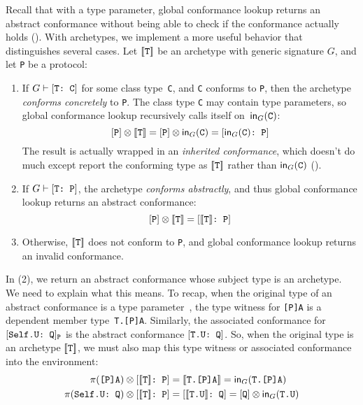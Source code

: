 \documentclass[../generics]{subfiles}
\begin{document}
Recall that with a type parameter, global conformance lookup returns an abstract conformance without being able to check if the conformance actually holds (). With archetypes, we implement a more useful behavior that distinguishes several cases. Let $[\![\texttt{T}]\!]$ be an archetype with generic signature $G$, and let \texttt{P} be a protocol:
\begin{enumerate}
\item If $G\vdash[\texttt{T:~C}]$ for some class type~\texttt{C}, and \texttt{C} conforms to \texttt{P}, then the archetype \emph{conforms concretely} to \texttt{P}. The class type \texttt{C} may contain type parameters, so global conformance lookup recursively calls itself on~$\mathsf{in}_G(\texttt{C})$:
\[[\texttt{P}] \otimes [\![\texttt{T}]\!]=[\texttt{P}] \otimes \mathsf{in}_G(\texttt{C})=[\texttt{$\mathsf{in}_G(\texttt{C})$:~P}]\]
The result is actually wrapped in an \emph{inherited conformance}, which doesn't do much except report the conforming type as $[\![\texttt{T}]\!]$ rather than $\mathsf{in}_G(\texttt{C})$ ().
\item If $G\vdash[\texttt{T:~P}]$, the archetype \emph{conforms abstractly}, and thus global conformance lookup returns an abstract conformance:
\[[\texttt{P}]\otimes[\![\texttt{T}]\!]=[\texttt{$[\![\texttt{T}]\!]$:~P}]\]
\item Otherwise, $[\![\texttt{T}]\!]$ does not conform to \texttt{P}, and global conformance lookup returns an invalid conformance.
\end{enumerate}
In (2), we return an abstract conformance whose subject type is an archetype. We need to explain what this means. To recap, when the original type of an abstract conformance is a type parameter~\tT, the type witness for \texttt{[P]A} is a dependent member type~\texttt{T.[P]A}. Similarly, the associated conformance for $[\texttt{Self.U:~Q}]_{\texttt{P}}$ is the abstract conformance $[\texttt{T.U:~Q}]$. So, when the original type is an archetype $[\![\texttt{T}]\!]$, we must also map this type witness or associated conformance into the environment:
\begin{align*}
\AssocType{[P]A}\otimes \ConfReq{$\archetype{T}$}{P} &=\archetype{T.[P]A}= \MapIn(\texttt{T.[P]A})\\
\AssocConf{Self.U}{Q}\otimes \ConfReq{$\archetype{T}$}{P} &=\ConfReq{$\archetype{T.U}$}{Q}= \pQ\otimes\MapIn(\texttt{T.U})
\end{align*}
\end{document}
